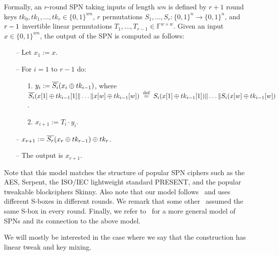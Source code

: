 



Formally, an $r$-round SPN taking inputs of length $w n$ is defined by $r+1$ round keys $tk_0,tk_1,\ldots,tk_r\in\{0,1\}^{wn}$, $r$ permutations $S_1,\ldots,S_r:\{0,1\}^{n} \rightarrow \{0,1\}^{n}$, and $\mathnormal{r}-1$ invertible linear permutations $T_1,\ldots,T_{r-1}\in\mathbb{F}^{w\times w}$. Given an input $x \in \{0,1\}^{w n}$, the output of the SPN is computed as follows:

\begin{itemize}
  \item[--]
  Let $x_1 := x$.
  \item[--]
  For $i = 1$ to $r-1$ do:
  \begin{itemize}
  	\item[1.] $y_{i} := \overline{S_i}(x_{i}\oplus tk_{i-1})$, where $\overline{S_i}(x[1]\oplus tk_{i-1}[1]\|\ldots\| x[w]\oplus tk_{i-1}[w]) \stackrel{\text { def }}{=} S_i(x[1]\oplus tk_{i-1}[1])\|\ldots\| S_i(x[w]\oplus tk_{i-1}[w])$.
    \item[2.] 
    $x_{i + 1} := T_i\cdot y_i$.
  \end{itemize}
  \item[--] $x_{r+1} := \overline{S_r}(x_r\oplus tk_{r-1})\oplus tk_r$.
  \item[--]
  The output is $x_{r+1}$.
\end{itemize}

Note that this model matches the structure of popular SPN ciphers such as the AES, Serpent, the ISO/IEC lightweight standard PRESENT, and the popular tweakable blockciphers Skinny. Also note that our model follows~\cite[Sect. 4.2]{C:CDKLST18} and uses different S-boxes in different rounds. We remark that some other~\cite[Sect. 3]{C:CDKLST18} assumed the same S-box in every round. Finally, we refer to~\cite[Sect. 2.1]{EPRINT:DKSTZ17} for a more general model of SPNs and its connection to the above model.


We will mostly be interested in the case where
we say that the construction has linear tweak and key mixing.








